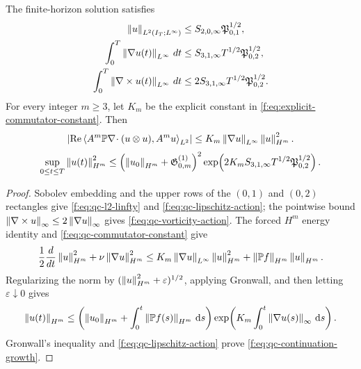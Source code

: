 \begin{proposition}
\label{f:prop:qc-continuation-norms}
The finite-horizon solution satisfies
\begin{align}
 \left\lVert u\right\rVert_{L^2(I_T;L^\infty)}
 &\le S_{2,0,\infty}\mathfrak P_{0,1}^{1/2},
 \label{f:eq:qc-l2-linfty}\\
 \int_0^T\left\lVert \nabla u(t)\right\rVert_{L^\infty}\,dt
 &\le S_{3,1,\infty}T^{1/2}\mathfrak P_{0,2}^{1/2},
 \label{f:eq:qc-lipschitz-action}\\
 \int_0^T\left\lVert \nabla\times u(t)\right\rVert_{L^\infty}\,dt
 &\le 2S_{3,1,\infty}T^{1/2}\mathfrak P_{0,2}^{1/2}.
 \label{f:eq:qc-vorticity-action}
\end{align}
For every integer \(m\ge3\), let \(K_m\) be the explicit constant in
\eqref{f:eq:explicit-commutator-constant}.  Then
\begin{equation}
 \left|\operatorname{Re}
 \left\langle A^m\mathbb P\nabla\!\cdot(u\otimes u),A^m u\right\rangle_{L^2}\right|
 \le K_m\left\lVert \nabla u\right\rVert_{L^\infty}\left\lVert u\right\rVert_{H^m}^2.
 \label{f:eq:qc-commutator-constant}
\end{equation}
\begin{equation}
 \sup_{0\le t\le T}\left\lVert u(t)\right\rVert_{H^m}^2
 \le
 \left(\left\lVert u_0\right\rVert_{H^m}+\mathfrak G^{(1)}_{0,m}\right)^2
 \exp\!\left(
 2K_mS_{3,1,\infty}T^{1/2}\mathfrak P_{0,2}^{1/2}
 \right).
 \label{f:eq:qc-continuation-growth}
\end{equation}
\end{proposition}

\begin{proof}
Sobolev embedding and the upper rows of the \((0,1)\) and \((0,2)\)
rectangles give \eqref{f:eq:qc-l2-linfty} and
\eqref{f:eq:qc-lipschitz-action}; the pointwise bound
\(\left\lVert \nabla\times u\right\rVert_\infty\le2\left\lVert \nabla u\right\rVert_\infty\) gives
\eqref{f:eq:qc-vorticity-action}.  The forced \(H^m\) energy identity and
\eqref{f:eq:qc-commutator-constant} give
\[
 \frac12\frac d{dt}\left\lVert u\right\rVert_{H^m}^2
 +\nu\left\lVert \nabla u\right\rVert_{H^m}^2
 \le K_m\left\lVert \nabla u\right\rVert_{L^\infty}\left\lVert u\right\rVert_{H^m}^2
 +\left\lVert \mathbb P f\right\rVert_{H^m}\left\lVert u\right\rVert_{H^m}.
\]
Regularizing the norm by
\((\left\lVert u\right\rVert_{H^m}^2+\varepsilon)^{1/2}\), applying Gronwall, and then
letting \(\varepsilon\downarrow0\) gives
\[
 \left\lVert u(t)\right\rVert_{H^m}
 \le\left(\left\lVert u_0\right\rVert_{H^m}
 +\int_0^t\left\lVert \mathbb P f(s)\right\rVert_{H^m}\,\mathrm d s\right)
 \exp\!\left(K_m\int_0^t\left\lVert \nabla u(s)\right\rVert_\infty\,\mathrm d s\right).
\]
Gronwall's inequality and \eqref{f:eq:qc-lipschitz-action} prove
\eqref{f:eq:qc-continuation-growth}.
\end{proof}

